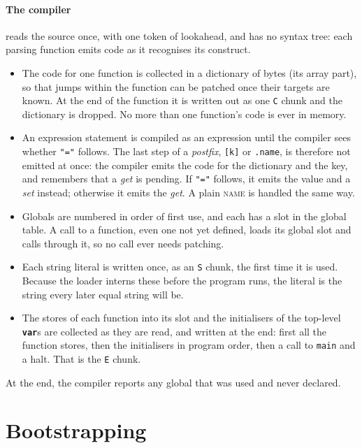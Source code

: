 \documentclass[11pt,a4paper]{article}
\newcommand{\kw}[1]{\textbf{\texttt{#1}}}
\newcommand{\nt}[1]{\textit{#1}}
\newcommand{\tok}[1]{\texttt{"#1"}}
\begin{document}
\paragraph{The compiler} reads the source once, with one token of lookahead,
and has no syntax tree: each parsing function emits code as it recognises
its construct.
\begin{itemize}[nosep]
\item The code for one function is collected in a dictionary of bytes
  (its array part), so that jumps within the function can be patched once
  their targets are known. At the end of the function it is written out as
  one \texttt{C} chunk and the dictionary is dropped. No more than one
  function's code is ever in memory.
\item An expression statement is compiled as an expression until the
  compiler sees whether \tok{=} follows. The last step of a \nt{postfix},
  \verb|[k]| or \verb|.name|, is therefore not emitted at once: the compiler
  emits the code for the dictionary and the key, and remembers that a
  \emph{get} is pending. If \tok{=} follows, it emits the value and a
  \emph{set} instead; otherwise it emits the \emph{get}. A plain
  \textsc{name} is handled the same way.
\item Globals are numbered in order of first use, and each has a slot in the
  global table. A call to a function, even one not yet defined, loads its
  global slot and calls through it, so no call ever needs patching.
\item Each string literal is written once, as an \texttt{S} chunk, the first
  time it is used. Because the loader interns these before the program
  runs, the literal is the string every later equal string will be.
\item The stores of each function into its slot and the initialisers of
  the top-level \kw{var}s are collected as they are read, and written at the
  end: first all the function stores, then the initialisers in program order,
  then a call to \texttt{main} and a halt. That is the \texttt{E} chunk.
\end{itemize}
At the end, the compiler reports any global that was used and never
declared.

\section{Bootstrapping}\label{sec:bootstrap}
\end{document}
